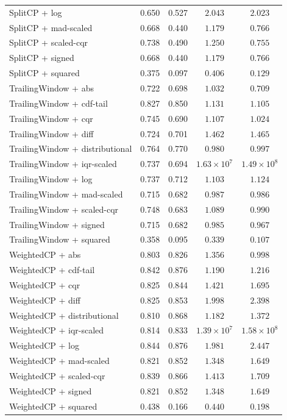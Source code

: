 \begin{longtable}{lcccc}
	SplitCP + log & 0.650 & 0.527 & $2.043$ & $2.023$ \\
	SplitCP + mad-scaled & 0.668 & 0.440 & $1.179$ & $0.766$ \\
	SplitCP + scaled-cqr & 0.738 & 0.490 & $1.250$ & $0.755$ \\
	SplitCP + signed & 0.668 & 0.440 & $1.179$ & $0.766$ \\
	SplitCP + squared & 0.375 & 0.097 & $0.406$ & $0.129$ \\
	TrailingWindow + abs & 0.722 & 0.698 & $1.032$ & $0.709$ \\
	TrailingWindow + cdf-tail & 0.827 & 0.850 & $1.131$ & $1.105$ \\
	TrailingWindow + cqr & 0.745 & 0.690 & $1.107$ & $1.024$ \\
	TrailingWindow + diff & 0.724 & 0.701 & $1.462$ & $1.465$ \\
	TrailingWindow + distributional & 0.764 & 0.770 & $0.980$ & $0.997$ \\
	TrailingWindow + iqr-scaled & 0.737 & 0.694 & $1.63 \times 10^{7}$ & $1.49 \times 10^{8}$ \\
	TrailingWindow + log & 0.737 & 0.712 & $1.103$ & $1.124$ \\
	TrailingWindow + mad-scaled & 0.715 & 0.682 & $0.987$ & $0.986$ \\
	TrailingWindow + scaled-cqr & 0.748 & 0.683 & $1.089$ & $0.990$ \\
	TrailingWindow + signed & 0.715 & 0.682 & $0.985$ & $0.967$ \\
	TrailingWindow + squared & 0.358 & 0.095 & $0.339$ & $0.107$ \\
	WeightedCP + abs & 0.803 & 0.826 & $1.356$ & $0.998$ \\
	WeightedCP + cdf-tail & 0.842 & 0.876 & $1.190$ & $1.216$ \\
	WeightedCP + cqr & 0.825 & 0.844 & $1.421$ & $1.695$ \\
	WeightedCP + diff & 0.825 & 0.853 & $1.998$ & $2.398$ \\
	WeightedCP + distributional & 0.810 & 0.868 & $1.182$ & $1.372$ \\
	WeightedCP + iqr-scaled & 0.814 & 0.833 & $1.39 \times 10^{7}$ & $1.58 \times 10^{8}$ \\
	WeightedCP + log & 0.844 & 0.876 & $1.981$ & $2.447$ \\
	WeightedCP + mad-scaled & 0.821 & 0.852 & $1.348$ & $1.649$ \\
	WeightedCP + scaled-cqr & 0.839 & 0.866 & $1.413$ & $1.709$ \\
	WeightedCP + signed & 0.821 & 0.852 & $1.348$ & $1.649$ \\
	WeightedCP + squared & 0.438 & 0.166 & $0.440$ & $0.198$ \\
\end{longtable}
